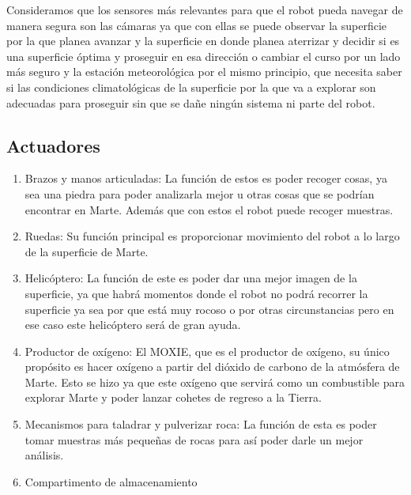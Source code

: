 \documentclass{article}
\begin{document}
        Consideramos que los sensores más relevantes para que el robot pueda navegar de manera segura son las cámaras ya que con ellas se puede observar la superficie por la que planea avanzar y la superficie en donde planea aterrizar y decidir si es una superficie óptima y proseguir en esa dirección o cambiar el curso por un lado más seguro y la estación meteorológica por el mismo principio, que necesita saber si las condiciones climatológicas de la superficie por la que va a explorar son adecuadas para proseguir sin que se dañe ningún sistema ni parte del robot.

        \subsection{Actuadores}
            \begin{enumerate}
                \item Brazos y manos articuladas: La función de estos es poder recoger cosas, ya sea una piedra para poder analizarla mejor u otras cosas que se podrían encontrar en Marte. Además que con estos el robot puede recoger muestras. 
                \item Ruedas: Su función principal es proporcionar movimiento del robot a lo largo de la superficie de Marte.
                \item Helicóptero: La función de este es poder dar una mejor imagen de la superficie, ya que habrá momentos donde el robot no podrá recorrer la superficie ya sea por que está muy rocoso o por otras circunstancias pero en ese caso este helicóptero será de gran ayuda. 
                \item Productor de oxígeno: El MOXIE, que es el productor de oxígeno, su único propósito es hacer oxígeno a partir del dióxido de carbono de la atmósfera de Marte. Esto se hizo ya que este oxígeno que servirá como un combustible para explorar Marte y poder lanzar cohetes de regreso a la Tierra.
                \item Mecanismos para taladrar y pulverizar roca: La función de esta es poder tomar muestras más pequeñas de rocas para así poder darle un mejor análisis. 
                \item Compartimento de almacenamiento
            \end{enumerate}
\end{document}
